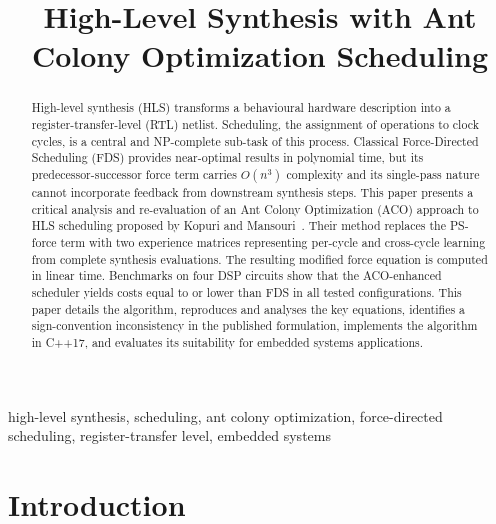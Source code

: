 \documentclass[conference]{IEEEtran}
\begin{document}
\title{High-Level Synthesis with Ant Colony Optimization Scheduling}

\author{
}

\maketitle

\begin{abstract}
High-level synthesis (HLS) transforms a behavioural hardware description
into a register-transfer-level (RTL) netlist. Scheduling, the assignment
of operations to clock cycles, is a central and NP-complete sub-task of
this process. Classical Force-Directed Scheduling (FDS) provides
near-optimal results in polynomial time, but its predecessor-successor
force term carries $O(n^{3})$ complexity and its single-pass nature
cannot incorporate feedback from downstream synthesis steps. This paper
presents a critical analysis and re-evaluation of an Ant Colony
Optimization (ACO) approach to HLS scheduling proposed by Kopuri and
Mansouri~\cite{kopuri2004aco}. Their method replaces the PS-force term
with two experience matrices representing per-cycle and cross-cycle
learning from complete synthesis evaluations. The resulting modified
force equation is computed in linear time. Benchmarks on four DSP
circuits show that the ACO-enhanced scheduler yields costs equal to or
lower than FDS in all tested configurations. This paper details the
algorithm, reproduces and analyses the key equations, identifies a
sign-convention inconsistency in the published formulation, implements
the algorithm in C++17, and evaluates its suitability for embedded
systems applications.
\end{abstract}

\begin{IEEEkeywords}
high-level synthesis, scheduling, ant colony optimization, force-directed
scheduling, register-transfer level, embedded systems
\end{IEEEkeywords}

\section{Introduction}
\end{document}
